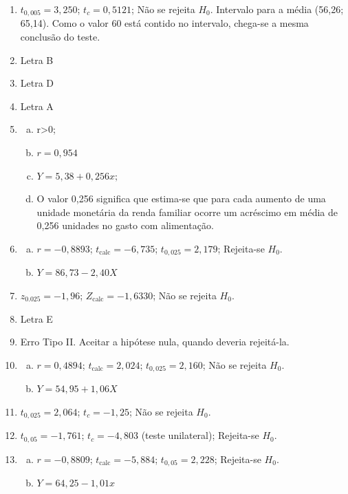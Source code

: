 \documentclass[12pt, a4paper]{article}
\begin{document}
\begin{enumerate}
    \item $t_{0,005}=3,250$; $t_{c}=0,5121$; Não se rejeita $H_0$. Intervalo para a média (56,26; 65,14). Como o valor 60 está contido no intervalo, chega-se a mesma conclusão do teste.
    \item Letra B
    \item Letra D
    \item Letra A
    \item 
    \begin{enumerate}[a)]
        \item r>0;
        \item $r=0,954$
        \item $Y=5,38+0,256x;$
        \item O valor 0,256 significa que estima-se que para cada aumento de uma unidade monetária da renda familiar ocorre um acréscimo em média de 0,256 unidades no gasto com alimentação.
    \end{enumerate}
    \item
    \begin{enumerate}[a)]
        \item $r=-0,8893$; $t_{\text{calc}}=-6,735$; $t_{0,025}=2,179$; Rejeita-se $H_0$.
        \item $Y=86,73-2,40 X$
    \end{enumerate}
    \item $z_{0.025}=-1,96$; $Z_{\text{calc}}=-1,6330$; Não se rejeita $H_0$.
    \item Letra E
    \item Erro Tipo II. Aceitar a hipótese nula, quando deveria rejeitá-la.
    \item
    \begin{enumerate}[a)]
        \item $r=0,4894$; $t_{\text{calc}}=2,024$; $t_{0,025}=2,160$; Não se rejeita $H_{0}$.
        \item $Y=54,95+1,06 X$
    \end{enumerate}
    \item $t_{0,025}=2,064$; $t_{c}=-1,25$; Não se rejeita $H_0$.
    \item $t_{0,05}=-1,761$; $t_{c}=-4,803$ (teste unilateral); Rejeita-se $H_0$.
    \item
    \begin{enumerate}[a)]
        \item $r=-0,8809$; $t_{\text{calc}}=-5,884$; $t_{0,05}=2,228$; Rejeita-se $H_0$.
        \item $Y=64,25-1,01x$
    \end{enumerate}

\end{enumerate}
\end{document}
